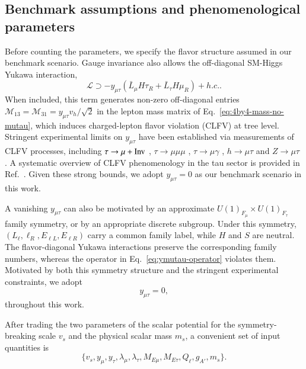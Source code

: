 \documentclass[onecolumn, aps, nofootinbib, prd, preprint, floats, floatfix, amsmath, amssymb, superscriptaddress, preprintnumbers]{revtex4-2}
\begin{document}
\subsection{Benchmark assumptions and phenomenological parameters}

Before counting the parameters, we specify the flavor structure assumed in our benchmark scenario. Gauge invariance also allows the off-diagonal SM-Higgs Yukawa interaction,
\begin{equation}
    \mathcal{L}\supset
    -y_{\mu\tau}(\bar{L}_{\mu}H \tau_R + \bar{L}_{\tau}H \mu_R)+h.c. .
\label{eq:ymutau-operator}
\end{equation}
When included, this term generates non-zero off-diagonal entries $\mathcal{M}_{13}=\mathcal{M}_{31}=y_{\mu\tau}v_h/\sqrt{2}$ in the lepton mass matrix of Eq.~\eqref{eq:4by4-mass-no-mutau}, which induces charged-lepton flavor violation (CLFV) at tree level. Stringent experimental limits on $y_{\mu\tau}$ have been established via measurements of CLFV processes, including $\tau\to\mu +{\rm Inv}$ \cite{Ibarra:2021xyk}, $\tau\to\mu \mu\mu$ \cite{Ibarra:2021xyk,Hayasaka:2010np,Belle-II:2024sce}, $\tau\to \mu\gamma$ \cite{Belle:2021ysv}, $h\to\mu\tau$ \cite{Harnik:2012pb,CMS:2021rsq} and $Z\to \mu\tau$ \cite{ATLAS:2021bdj}.
A systematic overview of CLFV phenomenology in the tau sector is provided in Ref.~\cite{Banerjee:2022xuw}. Given these strong bounds, we adopt $y_{\mu\tau}=0$ as our benchmark scenario in this work.

A vanishing $y_{\mu\tau}$ can also be motivated by an approximate
$U(1)_{F_\mu}\times U(1)_{F_\tau}$ family symmetry, or by an appropriate discrete subgroup. Under this symmetry,
$(L_\ell,\ell_R,E_{\ell L},E_{\ell R})$ carry a common family label, while $H$ and $S$ are neutral. The flavor-diagonal Yukawa interactions preserve the corresponding family numbers, whereas the operator in Eq.~\eqref{eq:ymutau-operator} violates them. Motivated by both this symmetry structure and the stringent experimental constraints, we adopt
\begin{equation}
y_{\mu\tau}=0,
\end{equation}
throughout this work.

After trading the two parameters of the scalar potential for the symmetry-breaking scale $v_s$ and the physical scalar mass $m_s$, a convenient set of input quantities is
\begin{equation}
    \{v_s, y_\mu, y_\tau, \lambda_\mu,\lambda_\tau, M_{E\mu}, M_{E\tau}, Q_\ell, g_{A'}, m_s \}.
\end{equation}
\end{document}
